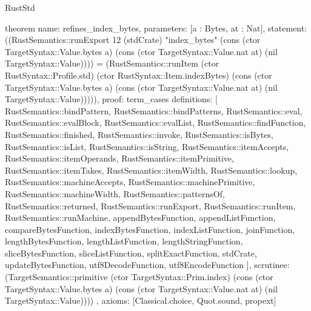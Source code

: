 \begin{lexlean}{RustStd}
\begin{semanticmodule}
theorem{
  name: refines_index_bytes,
  parameters: [a : Bytes, at : Nat],
  statement: ((RustSemantics::runExport 12 (stdCrate) "index_bytes" (cons (ctor TargetSyntax::Value.bytes a) (cons (ctor TargetSyntax::Value.nat at) (nil TargetSyntax::Value)))) = (RustSemantics::runItem (ctor RustSyntax::Profile.std) (ctor RustSyntax::Item.indexBytes) (cons (ctor TargetSyntax::Value.bytes a) (cons (ctor TargetSyntax::Value.nat at) (nil TargetSyntax::Value))))),
  proof: term_cases{
    definitions: [
      RustSemantics::bindPattern,
      RustSemantics::bindPatterns,
      RustSemantics::eval,
      RustSemantics::evalBlock,
      RustSemantics::evalList,
      RustSemantics::findFunction,
      RustSemantics::finished,
      RustSemantics::invoke,
      RustSemantics::isBytes,
      RustSemantics::isList,
      RustSemantics::isString,
      RustSemantics::itemAccepts,
      RustSemantics::itemOperands,
      RustSemantics::itemPrimitive,
      RustSemantics::itemTakes,
      RustSemantics::itemWidth,
      RustSemantics::lookup,
      RustSemantics::machineAccepts,
      RustSemantics::machinePrimitive,
      RustSemantics::machineWidth,
      RustSemantics::patternsOf,
      RustSemantics::returned,
      RustSemantics::runExport,
      RustSemantics::runItem,
      RustSemantics::runMachine,
      appendBytesFunction,
      appendListFunction,
      compareBytesFunction,
      indexBytesFunction,
      indexListFunction,
      joinFunction,
      lengthBytesFunction,
      lengthListFunction,
      lengthStringFunction,
      sliceBytesFunction,
      sliceListFunction,
      splitExactFunction,
      stdCrate,
      updateBytesFunction,
      utf8DecodeFunction,
      utf8EncodeFunction
    ],
    scrutinee: (TargetSemantics::primitive (ctor TargetSyntax::Prim.index) (cons (ctor TargetSyntax::Value.bytes a) (cons (ctor TargetSyntax::Value.nat at) (nil TargetSyntax::Value))))
  },
  axioms: [Classical.choice, Quot.sound, propext]
}


\end{semanticmodule}
\end{lexlean}
